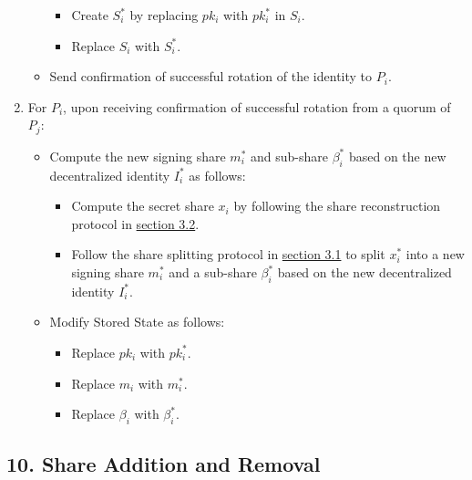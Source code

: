 \documentclass[
]{article}
\providecommand{\tightlist}{%
  \setlength{\itemsep}{0pt}\setlength{\parskip}{0pt}}
\begin{document}
\begin{enumerate}
\begin{itemize}
    \begin{itemize}
    \tightlist
    \item
      Create \(S_i^ \ast\) by replacing \(pk_i\) with \(pk_i^ \ast\) in
      \(S_i\).
    \item
      Replace \(S_i\) with \(S_i^ \ast\).
    \end{itemize}
  \item
    Send confirmation of successful rotation of the identity to \(P_i\).
  \end{itemize}
\item
  For \(P_i\), upon receiving confirmation of successful rotation from a
  quorum of \(P_j\):

  \begin{itemize}
  \tightlist
  \item
    Compute the new signing share \(m_i^ \ast\) and sub-share
    \(\beta _i^ \ast\) based on the new decentralized identity
    \(I_i^ \ast\) as follows:

    \begin{itemize}
    \tightlist
    \item
      Compute the secret share \(x_i\) by following the share
      reconstruction protocol in
      \protect\hyperlink{share-reconstruction}{section 3.2}.
    \item
      Follow the share splitting protocol in
      \protect\hyperlink{share-splitting}{section 3.1} to split
      \(x_i^ \ast\) into a new signing share \(m_i^ \ast\) and a
      sub-share \(\beta _i^ \ast\) based on the new decentralized
      identity \(I_i^ \ast\).
    \end{itemize}
  \item
    Modify Stored State as follows:

    \begin{itemize}
    \tightlist
    \item
      Replace \(pk_i\) with \(pk_i^ \ast\).
    \item
      Replace \(m_i\) with \(m_i^ \ast\).
    \item
      Replace \(\beta _i\) with \(\beta _i^ \ast\).
    \end{itemize}
  \end{itemize}
\end{enumerate}

\hypertarget{share-addition-and-removal}{%
\subsection{10. Share Addition and
Removal}\label{share-addition-and-removal}}
\end{document}

